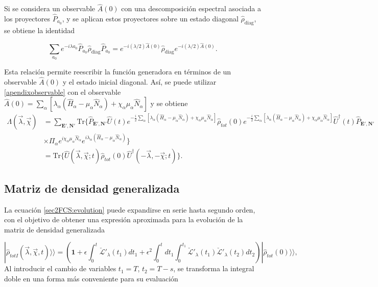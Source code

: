 \begin{appendixs}
Si se considera un observable $\hat{A}(0)$ con una descomposición espectral asociada a los proyectores $\hat{P}_{a_0}$, y se aplican estos proyectores sobre un estado diagonal $\hat{\rho}_{\text{diag}}$, se obtiene la identidad\cite{esposito2009nonequilibrium}

\begin{equation}
    \sum_{a_0} e^{-i\lambda a_0} \hat{P}_{a_0} \hat{\rho}_{\text{diag}} \hat{P}_{a_0} 
    = e^{-i(\lambda/2)\hat{A}(0)} \hat{\rho}_{\text{diag}} e^{-i(\lambda/2)\hat{A}(0)}.
    \label{apendixobservable}
\end{equation}

Esta relación permite reescribir la función generadora en términos de un observable $\hat{A}(0)$ y el estado inicial diagonal. Así, se puede utilizar \ref{apendixobservable} con el observable $\hat{A}(0) = \sum_{\alpha}[\lambda_{\alpha}(\hat{H}_{\alpha}-\mu_{\alpha}\hat{N}_{\alpha}) + \chi_{\alpha}\mu_{\alpha}\hat{N}_{\alpha}] $ y se obtiene 
\begin{align*}
    \Lambda(\vec{\lambda},\vec{\chi}) & = \sum_{\textbf{E}',\textbf{N}'}\text{Tr}\{ \hat{P}_{\textbf{E}',\textbf{N}'} \hat{U}(t) e^{-\frac{i}{2}\sum_{\alpha}[\lambda_{\alpha}(\hat{H}_{\alpha} - \mu_{\alpha}\hat{N}_{\alpha}) + \chi_{\alpha}\mu_{\alpha}\hat{N}_{\alpha}  ]}  \hat{\rho}_{tot}(0) e^{-\frac{i}{2}\sum_{\alpha}[\lambda_{\alpha}(\hat{H}_{\alpha} - \mu_{\alpha}\hat{N}_{\alpha}) + \chi_{\alpha}\mu_{\alpha}\hat{N}_{\alpha} ] }\hat{U}^{\dagger}(t) \hat{P}_{\textbf{E}',\textbf{N}'}  \\
    & \times \Pi_{\alpha}e^{i\chi_{\alpha}\mu_{\alpha}\hat{N}_{\alpha}}e^{i\lambda_{\alpha}(\hat{H}_{\alpha} -\mu_{\alpha}\hat{N}_{\alpha})} \} \\
    & = \text{Tr}\{ \hat{U}(\vec{\lambda},\vec{\chi};t)\hat{\rho}_{tot}(0)\hat{U}^{\dagger}(-\vec{\lambda},-\vec{\chi};t)  \}.
\end{align*}

\newpage 

    \subsection{Matriz de densidad generalizada}

La ecuación \ref{sec2FCS:evolution} puede expandirse en serie hasta segundo orden, con el objetivo de obtener una expresión aproximada para la evolución de la matriz de densidad generalizada

    \begin{equation*}
        |\hat{\rho}_{totI}(\vec{\lambda},\vec{\chi},t)\rangle \rangle  = \left( \textbf{1} + \epsilon \int_{0}^{t}\check{\mathcal{L}}'_{\lambda}(t_{1})dt_{1} + \epsilon^{2}\int_{0}^{t}dt_{1}\int_{0}^{t_{1}}\check{\mathcal{L}}'_{\lambda}(t_{1})\check{\mathcal{L}}'_{\lambda}(t_{2})dt_{2} \right) |\hat{\rho}_{tot}(0)\rangle \rangle, 
    \end{equation*}
Al introducir el cambio de variables \( t_1 = T \), \( t_2 = T - s \), se transforma la integral doble en una forma más conveniente para su evaluación


\end{appendixs}
